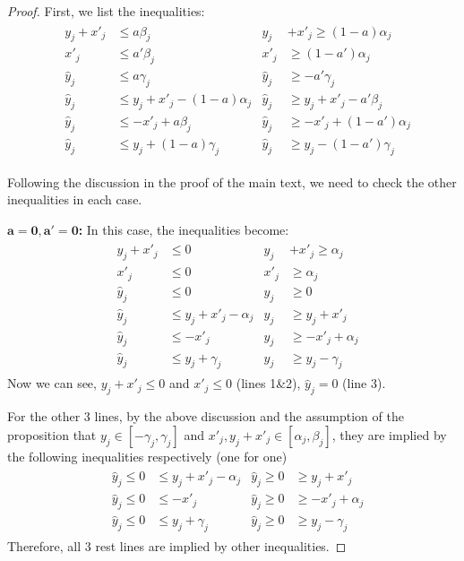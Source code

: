 \begin{proof}[Proof]
	First, we list the inequalities: \begin{align*}
		& \begin{aligned}
			y_j + x'_j &\leq a\beta_j        &
			y_j &+ x'_j \geq (1-a)\alpha_j \\
			x'_j       &\leq a'\beta_j       & 
			x'_j       &\geq (1-a')\alpha_j \\
			\hat{y}_j  &\leq a\gamma_j       &
			\hat{y}_j  &\geq -a'\gamma_j \\
			\hat{y}_j  &\leq y_j + x'_j - (1-a)\alpha_j &
			\hat{y}_j  &\geq y_j + x'_j - a'\beta_j \\
			\hat{y}_j  &\leq -x'_j + a\beta_j &
			\hat{y}_j  &\geq -x'_j + (1-a')\alpha_j \\
			\hat{y}_j  &\leq y_j + (1-a)\gamma_j  &
			\hat{y}_j  &\geq y_j - (1-a')\gamma_j
		\end{aligned}
	\end{align*} 
	
	Following the discussion in the proof of the main text, we need to check the other inequalities in each case.
	
 \textbf{$\mathbf{a = 0, a' = 0}$:}  In this case, the inequalities become: \begin{align*}
 	& \begin{aligned}
 		y_j + x'_j &\leq 0       &
 		y_j &+ x'_j \geq \alpha_j \\
 		x'_j       &\leq 0       & 
 		x'_j       &\geq \alpha_j \\
 		\hat{y}_j  &\leq 0       &
 		\hat{y}_j  &\geq 0 \\
 		\hat{y}_j  &\leq y_j + x'_j -\alpha_j &
 		\hat{y}_j  &\geq y_j + x'_j  \\
 		\hat{y}_j  &\leq -x'_j  &
 		\hat{y}_j  &\geq -x'_j + \alpha_j \\
 		\hat{y}_j  &\leq y_j + \gamma_j  &
 		\hat{y}_j  &\geq y_j - \gamma_j
 	\end{aligned}
 \end{align*} Now we can see, $y_j+x'_j\leq 0$ and $x'_j \leq 0$ (lines 1\&2), $\hat{y}_j=0$ (line 3). 
 
 For the other 3 lines, by the above discussion and the assumption of the proposition that $y_j \in [-\gamma_j, \gamma_j]$ and $x'_j,y_j+x'_j \in [\alpha_j,\beta_j]$, they are implied by the following inequalities respectively (one for one) \begin{align*}
 & \begin{aligned}
 	\hat{y}_j  \leq 0 &\leq y_j + x'_j -\alpha_j &
 	\hat{y}_j  \geq 0 &\geq y_j + x'_j  \\
 	\hat{y}_j  \leq 0 &\leq -x'_j  &
 	\hat{y}_j  \geq 0 &\geq -x'_j + \alpha_j \\
 	\hat{y}_j  \leq 0 &\leq y_j + \gamma_j  &
 	\hat{y}_j  \geq 0 &\geq y_j - \gamma_j
 \end{aligned}
 \end{align*} Therefore, all 3 rest lines are implied by other inequalities.
 

\end{proof}
